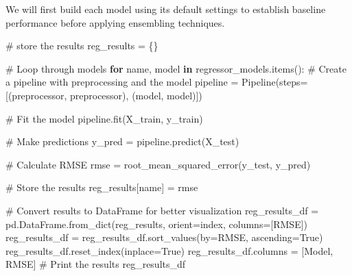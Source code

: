 \documentclass[
  letterpaper,
  DIV=11,
  numbers=noendperiod]{scrreprt}
\newenvironment{Shaded}{\begin{snugshade}}{\end{snugshade}}
\newcommand{\CommentTok}[1]{\textcolor[rgb]{0.37,0.37,0.37}{#1}}
\newcommand{\ControlFlowTok}[1]{\textcolor[rgb]{0.00,0.23,0.31}{\textbf{#1}}}
\newcommand{\KeywordTok}[1]{\textcolor[rgb]{0.00,0.23,0.31}{\textbf{#1}}}
\newcommand{\NormalTok}[1]{\textcolor[rgb]{0.00,0.23,0.31}{#1}}
\newcommand{\OperatorTok}[1]{\textcolor[rgb]{0.37,0.37,0.37}{#1}}
\newcommand{\StringTok}[1]{\textcolor[rgb]{0.13,0.47,0.30}{#1}}
\newcommand{\VariableTok}[1]{\textcolor[rgb]{0.07,0.07,0.07}{#1}}
\begin{document}
We will first build each model using its default settings to establish
baseline performance before applying ensembling techniques.

\begin{Shaded}
\begin{Highlighting}[]
\CommentTok{\# store the results}
\NormalTok{reg\_results }\OperatorTok{=}\NormalTok{ \{\}}

\CommentTok{\# Loop through models}
\ControlFlowTok{for}\NormalTok{ name, model }\KeywordTok{in}\NormalTok{ regressor\_models.items():}
    \CommentTok{\# Create a pipeline with preprocessing and the model}
\NormalTok{    pipeline }\OperatorTok{=}\NormalTok{ Pipeline(steps}\OperatorTok{=}\NormalTok{[(}\StringTok{\textquotesingle{}preprocessor\textquotesingle{}}\NormalTok{, preprocessor),}
\NormalTok{                               (}\StringTok{\textquotesingle{}model\textquotesingle{}}\NormalTok{, model)])}
    
    \CommentTok{\# Fit the model}
\NormalTok{    pipeline.fit(X\_train, y\_train)}
    
    \CommentTok{\# Make predictions}
\NormalTok{    y\_pred }\OperatorTok{=}\NormalTok{ pipeline.predict(X\_test)}
    
    \CommentTok{\# Calculate RMSE}
\NormalTok{    rmse }\OperatorTok{=}\NormalTok{ root\_mean\_squared\_error(y\_test, y\_pred)}
    
    \CommentTok{\# Store the results}
\NormalTok{    reg\_results[name] }\OperatorTok{=}\NormalTok{ rmse}

\CommentTok{\# Convert results to DataFrame for better visualization}
\NormalTok{reg\_results\_df }\OperatorTok{=}\NormalTok{ pd.DataFrame.from\_dict(reg\_results, orient}\OperatorTok{=}\StringTok{\textquotesingle{}index\textquotesingle{}}\NormalTok{, columns}\OperatorTok{=}\NormalTok{[}\StringTok{\textquotesingle{}RMSE\textquotesingle{}}\NormalTok{])}
\NormalTok{reg\_results\_df }\OperatorTok{=}\NormalTok{ reg\_results\_df.sort\_values(by}\OperatorTok{=}\StringTok{\textquotesingle{}RMSE\textquotesingle{}}\NormalTok{, ascending}\OperatorTok{=}\VariableTok{True}\NormalTok{)}
\NormalTok{reg\_results\_df.reset\_index(inplace}\OperatorTok{=}\VariableTok{True}\NormalTok{)}
\NormalTok{reg\_results\_df.columns }\OperatorTok{=}\NormalTok{ [}\StringTok{\textquotesingle{}Model\textquotesingle{}}\NormalTok{, }\StringTok{\textquotesingle{}RMSE\textquotesingle{}}\NormalTok{]}
\CommentTok{\# Print the results}
\NormalTok{reg\_results\_df}
\end{Highlighting}
\end{Shaded}
\end{document}
